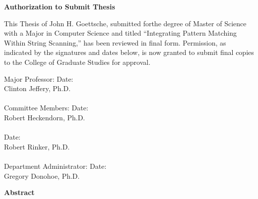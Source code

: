 \documentclass{article}
\begin{document}
\pagebreak
\large
\thispagestyle{fancy}
\begin{center}
\textbf{Authorization to Submit Thesis}
\end{center}
This Thesis of John H. Goettsche, submitted forthe degree of Master of Science with a Major in Computer Science and titled ``Integrating Pattern Matching Within String Scanning,'' has been reviewed in final form.  Permission, as indicated by the signatures and dates below, is now granted to submit final copies to the College of Graduate Studies for approval.\\
\vspace{0.3in}
\begin{singlespace}
\noindent
	Major Professor:\hspace{0.8in}\makebox[2.5in]{\hrulefill} Date: \makebox[1.0in]{\hrulefill} \\
	\-\hspace{2.0in}Clinton Jeffery, Ph.D.\\
	\vspace{0.1in}\\
	Committee Members:\hspace{0.5in}\makebox[2.5in]{\hrulefill} Date: \makebox[1.0in]{\hrulefill} \\
	\-\hspace{2.0in}Robert Heckendorn, Ph.D.\\
	\vspace{0.1in}\\
	\-\hspace{2.0in}\makebox[2.5in]{\hrulefill} Date: \makebox[1.0in]{\hrulefill} \\
	\-\hspace{2.0in}Robert Rinker, Ph.D.\\
	\vspace{0.1in}\\
	Department Administrator: \makebox[2.5in]{\hrulefill} Date: \makebox[1.0in]{\hrulefill} \\
	\-\hspace{2.0in}Gregory Donohoe, Ph.D.\\
\end{singlespace}

\pagebreak

\begin{center}
\textbf{Abstract}
\end{center}
\end{document}
